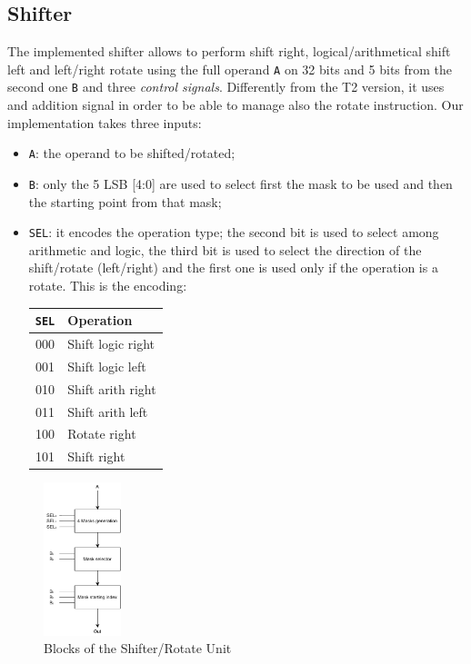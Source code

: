 \subsection{Shifter}
The implemented shifter allows to perform shift right, logical/arithmetical shift left and left/right rotate using the full operand \texttt{A} on 32 bits and 5 bits from the second one \texttt{B} and three \textit{control signals}.
Differently from the T2 version, it uses and addition signal in order to be able to manage also the rotate instruction. Our implementation takes three inputs:
\begin{itemize}
    \itemsep0sp
    \item \texttt{A}: the operand to be shifted/rotated;
    \item \texttt{B}: only the 5 LSB [4:0] are used to select first the mask to be used and then the starting point from that mask;
    \item \texttt{SEL}: it encodes the operation type; the second bit is used to select among arithmetic and logic, the third bit is used to select the direction of the shift/rotate (left/right) and the first one is used only if the operation is a rotate. This is the encoding:
    \begin{center}
        \begin{tabular}{c|l}
            \texttt{SEL} & \textbf{Operation}\\
            \hline
            000 & Shift logic right \\
            001 & Shift logic left \\
            010 & Shift arith right \\
            011 & Shift arith left \\
            100 & Rotate right \\
            101 & Shift right \\
        \end{tabular}
    \end{center}
\end{itemize}

\begin{figure}[ht]
    \centering
    \includegraphics[width=0.2\textwidth]{chapters/5_ExecuteStage/images/Shifter.pdf}
    \caption{Blocks of the Shifter/Rotate Unit}
    \label{fig:shifter}
\end{figure}

